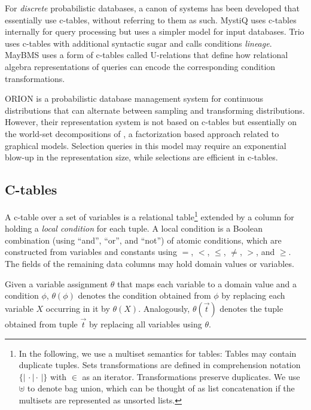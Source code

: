 For {\em discrete} probabilistic  databases, a canon of systems has been developed that essentially use c-tables, without referring to them as such. MystiQ  \cite{dalvi07efficient}  uses  c-tables internally  for  query processing  but  uses  a  simpler  model for  input  databases.   Trio \cite{WidomTrio2008}  uses  c-tables with  additional  syntactic sugar  and calls conditions {\em lineage}\/.  MayBMS \cite{AJKO2008}  uses a  form of  c-tables called  U-relations that define how relational algebra representations of queries can encode the corresponding condition transformations.

ORION \cite{ORION} is a probabilistic database management system for
continuous distributions that can alternate between sampling
and transforming distributions. However, their representation
system is not based on c-tables but essentially on the
world-set decompositions of \cite{AKO07WSD}, a factorization
based approach related to graphical models.
Selection queries in this model may require an exponential blow-up in the
representation size, while selections are efficient in c-tables.


\def\bagopen{\{\!|\,}
\def\bagclose{\,|\!\}}


\subsection{C-tables}
A c-table  over
a set  of variables is  a relational table\footnote{
In the following, we use a multiset semantics for tables: Tables may
contain duplicate tuples. Sets transformations are defined in comprehension notation $\bagopen \cdot \mid \cdot \bagclose$ with $\in$ as an iterator.  Transformations preserve duplicates.  We use $\uplus$ to denote bag union, which can be thought of as list concatenation if the multisets are represented as unsorted lists.
}
extended by a  column for holding a \textit{local  condition} for each
tuple.   A local condition  is a  Boolean combination  (using ``and'',
``or'', and ``not'') of  atomic conditions, which are constructed from
variables  and constants  using  $=$, $<$,  $\leq$,  $\neq$, $>$,  and
$\geq$.   The fields  of the  remaining data  columns may  hold domain
values or variables.

Given  a variable  assignment $\theta$  that maps  each variable  to a
domain  value  and  a  condition $\phi$,  $\theta(\phi)$  denotes  the
condition  obtained  from  $\phi$   by  replacing  each  variable  $X$
occurring  in  it   by  $\theta(X)$.   Analogously,  $\theta(\vec{t})$
denotes  the tuple  obtained  from tuple  $\vec{t}$  by replacing  all
variables using $\theta$.

